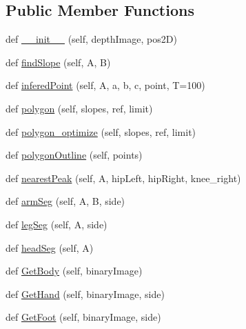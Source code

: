 \subsection*{Public Member Functions}
\begin{DoxyCompactItemize}
\item 
def \hyperlink{classsegmentation_1_1_segmentation_a1a50054187dc1e2eebe8685fdd208bf6}{\+\_\+\+\_\+init\+\_\+\+\_\+} (self, depth\+Image, pos2D)
\item 
def \hyperlink{classsegmentation_1_1_segmentation_a9ceb7a7b25953d9b693ab9f6fa1e6e3a}{find\+Slope} (self, A, B)
\item 
def \hyperlink{classsegmentation_1_1_segmentation_abc300f2410a48845de0e9ae32df38241}{infered\+Point} (self, A, a, b, c, point, T=100)
\item 
def \hyperlink{classsegmentation_1_1_segmentation_abbd3c1929edf660b23d908a99e2775ab}{polygon} (self, slopes, ref, limit)
\item 
def \hyperlink{classsegmentation_1_1_segmentation_a3fe70a2d840350c65e39d2f3938826bf}{polygon\+\_\+optimize} (self, slopes, ref, limit)
\item 
def \hyperlink{classsegmentation_1_1_segmentation_a13657232294fa4956ad7426d18ebfab4}{polygon\+Outline} (self, points)
\item 
def \hyperlink{classsegmentation_1_1_segmentation_a887e7665b0fc07dfb964223ef50dc295}{nearest\+Peak} (self, A, hip\+Left, hip\+Right, knee\+\_\+right)
\item 
def \hyperlink{classsegmentation_1_1_segmentation_acb6b057c22d3abbcc7de4e14453cfdc6}{arm\+Seg} (self, A, B, side)
\item 
def \hyperlink{classsegmentation_1_1_segmentation_a095a3b3205d784d6e7c3e072945ae7a5}{leg\+Seg} (self, A, side)
\item 
def \hyperlink{classsegmentation_1_1_segmentation_a57bb91652be301652103fa04944fced9}{head\+Seg} (self, A)
\item 
def \hyperlink{classsegmentation_1_1_segmentation_a974ac6a7e245713d6f5f2b7531fe6d71}{Get\+Body} (self, binary\+Image)
\item 
def \hyperlink{classsegmentation_1_1_segmentation_ac40379d03b4adb8c368d7d7d12e0d321}{Get\+Hand} (self, binary\+Image, side)
\item 
def \hyperlink{classsegmentation_1_1_segmentation_ad4a3e196437e4577129dc7c5aed2f559}{Get\+Foot} (self, binary\+Image, side)
\end{DoxyCompactItemize}
